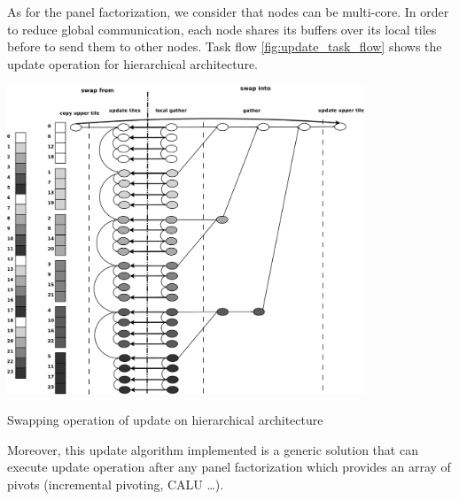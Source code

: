 As for the panel factorization, we consider that nodes can be multi-core. In order to reduce global communication, each node shares its buffers over its local tiles before to send them to other nodes. Task flow \ref{fig:update_task_flow} shows the update operation for hierarchical architecture.

\begin{taskflow}[!ht]
\centering
\includegraphics[width=0.8\textwidth]{figures/update_tf_bw.pdf}
\caption{Swapping operation of update on hierarchical architecture \label{fig:update_task_flow}}
\end{taskflow}

Moreover, this update algorithm implemented is a generic solution that can execute update operation after any panel factorization which provides an array of pivots (incremental pivoting, CALU \dots).
